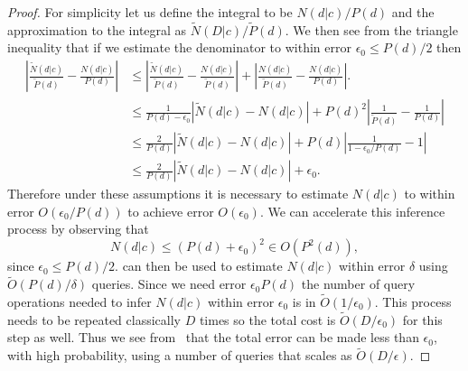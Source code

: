 \documentclass[aps,amsmath,onecolumn,amssymb,notitlepage]{revtex4-1}
\begin{document}
\begin{proof}
For simplicity let us define the integral to be $N(d|c)/P(d)$ and the approximation to the integral as $\tilde{N}(D|c)/\tilde{P}(d)$.  We then see from the triangle inequality that if we estimate the denominator to within error $\epsilon_0\le P(d)/2$ then
\begin{align}
\left|\frac{\tilde{N}(d|c)}{\tilde{P}(d)} -\frac{{N}(d|c)}{{P}(d)}\right|&\le \left|\frac{\tilde{N}(d|c)}{\tilde{P}(d)} -\frac{{N}(d|c)}{\tilde {P}(d)}\right|+\left|\frac{{N}(d|c)}{\tilde{P}(d)} -\frac{{N}(d|c)}{{P}(d)}\right|.\nonumber\\
&\le \frac{1}{P(d)-\epsilon_0}\left|{\tilde{N}(d|c)} -{{N}(d|c)}{}\right|+P(d)^2\left|\frac{1}{\tilde{P}(d)} -\frac{1}{{P}(d)}\right|\nonumber\\
&\le \frac{2}{P(d)}\left|{\tilde{N}(d|c)} -{{N}(d|c)}{}\right|+P(d)\left|\frac{1}{1-\epsilon_0/P(d)} -1\right|\nonumber\\
&\le \frac{2}{P(d)}\left|{\tilde{N}(d|c)} -{{N}(d|c)}{}\right|+\epsilon_0.\label{eq:2IntegralTerms}
\end{align}
Therefore under these assumptions it is necessary to estimate $N(d|c)$ to within error $O(\epsilon_0/P(d))$ to achieve error $O(\epsilon_0)$.
We can accelerate this inference process by observing that 
\begin{equation}
N(d|c)\le (P(d)+\epsilon_0)^2\in O(P^2(d)),
\end{equation}
since $\epsilon_0 \le P(d)/2$.   can then be used to estimate $N(d|c)$ within error $\delta$ using $\tilde O(P(d)/\delta)$ queries.  Since we need error $\epsilon_0P(d)$ the number of query operations needed to infer $N(d|c)$ within error $\epsilon_0$ is in $\tilde O(1/\epsilon_0)$.  This process needs to be repeated classically $D$ times so the total cost is $\tilde O(D/\epsilon_0)$ for this step as well.  Thus we see from~ that the total error can be made less than $\epsilon_0$, with high probability, using a number of queries that scales as $\tilde{O}(D/\epsilon)$.





\end{proof}
\end{document}

